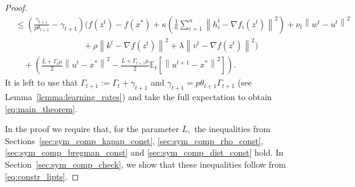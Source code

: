 \documentclass{article} %
\newcommand{\norm}[1]{\left\| #1 \right\|}
\newcommand{\ExpSub}[2]{{\mathbb{E}}_{#1}\left[#2\right]}
\theoremstyle{plain}
\theoremstyle{definition}
\theoremstyle{remark}
\newcommand{\eqdef}{:=}
\begin{document}
\begin{proof}
\begin{align*}
    &\leq \left(\frac{\gamma_{t+1}}{p\theta_{t+1}} - \gamma_{t+1}\right) \Bigg( f(z^{t}) - f(x^*) + \kappa \left(\frac{1}{n}\sum_{i=1}^n \norm{h_i^t - \nabla f_i(z^{t})}^2\right)  + \nu_{t} \norm{w^t - u^t}^2 \\
    &\qquad\qquad\qquad\qquad + \rho \norm{k^{t} - \nabla f(z^t)}^2 + \lambda \norm{v^{t} - \nabla f(z^t)}^2 \Bigg)\\
    &\quad+ \left(\frac{\bar{L} + \Gamma_{t} \mu}{2} \norm{u^t - x^*}^2 - \frac{\bar{L} + \Gamma_{t+1} \mu}{2} \ExpSub{t}{\norm{u^{t+1} - x^*}^2}\right).
  \end{align*}
  It is left to use that $\Gamma_{t+1} \eqdef \Gamma_{t} + \gamma_{t+1}$ and $\gamma_{t+1} = p \theta_{t+1} \Gamma_{t+1}$ (see Lemma~\ref{lemma:learning_rates}) and take the full expectation to obtain \eqref{eq:main_theorem}.

  In the proof we require that, for the parameter $\bar{L},$ the inequalities from Sections~\ref{sec:sym_comp_kapap_const}, \ref{sec:sym_comp_rho_const}, \ref{sec:sym_comp_bregman_const} and \ref{sec:sym_comp_dist_const} hold. In Section~\ref{sec:sym_comp_check}, we show that these inequalities follow from \eqref{eq:constr_lipts}.
\end{proof}
\end{document}

